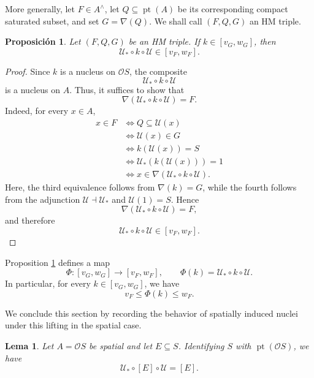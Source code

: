 \documentclass[11pt]{amsart}
\DeclareMathOperator{\pt}{pt}
\theoremstyle{plain}
\newtheorem{lem}[thm]{Lema}
\newtheorem{prop}[thm]{Proposición}
\theoremstyle{definition}
\begin{document}
More generally, let \(F\in A^\wedge\), let \(Q\subseteq\pt(A)\) be its corresponding compact saturated subset, and set \(G=\nabla(Q)\). 
We shall call \((F,Q,G)\) an HM triple.

\begin{prop}\label{morfismo} 
Let $(F,Q,G)$ be an HM triple. If \(k\in[v_G,w_G]\), then
\[
\mathcal{U}_*\circ k\circ \mathcal{U}\in[v_F,w_F].
\]
\end{prop}

\begin{proof}
Since $k$ is a nucleus on $\mathcal{O}S$, the composite
\[
    \mathcal{U}_*\circ k\circ\mathcal{U}
\]
is a nucleus on $A$. Thus, it suffices to show that
\[
    \nabla(\mathcal{U}_*\circ k\circ\mathcal{U})=F.
\]
Indeed, for every $x\in A$,
\[
\begin{aligned}
x\in F
&\iff Q\subseteq\mathcal{U}(x)\\
&\iff \mathcal{U}(x)\in G\\
&\iff k(\mathcal{U}(x))=S\\
&\iff \mathcal{U}_*(k(\mathcal{U}(x)))=1\\
&\iff x\in\nabla(\mathcal{U}_*\circ k\circ\mathcal{U}).
\end{aligned}
\]
Here, the third equivalence follows from $\nabla(k)=G$, while the
fourth follows from the adjunction $\mathcal{U}\dashv\mathcal{U}_*$
and $\mathcal{U}(1)=S$. Hence
\[
    \nabla(\mathcal{U}_*\circ k\circ\mathcal{U})=F,
\]
and therefore
\[
    \mathcal{U}_*\circ k\circ\mathcal{U}\in[v_F,w_F].
\]
\end{proof}

Proposition \ref{morfismo} defines a map
\[
\Phi\colon [v_G,w_G]\longrightarrow [v_F,w_F],
\qquad
\Phi(k)=\mathcal{U}_*\circ k\circ \mathcal{U}.
\]
In particular, for every $k\in[v_G,w_G]$, we have
\begin{equation}\label{comparacionvFwF}
v_F\leq \Phi(k) \leq w_F.
\end{equation}

We conclude this section by recording the behavior of spatially induced nuclei under this lifting in the spatial case.

\begin{lem}\label{lem:auxiliar}
Let \(A=\mathcal O S\) be spatial and let \(E\subseteq S\). Identifying \(S\) with \(\pt(\mathcal O S)\), we have
\[
\mathcal U_*\circ [E]\circ\mathcal U=[E].
\]
\end{lem}
\end{document}

